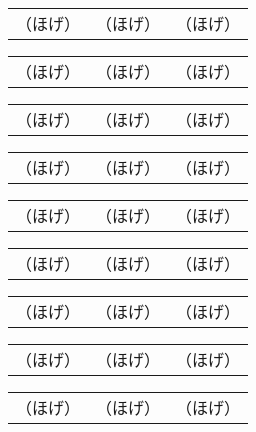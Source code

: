 \documentclass{jarticle}
\begin{document}
\begin{tabular}{|c|c|c|}
（ほげ）&（ほげ）&（ほげ）
\end{tabular}

\begin{tabular}{|l|l|l|}
（ほげ）&（ほげ）&（ほげ）
\end{tabular}

\begin{tabular}{|r|r|r|}
（ほげ）&（ほげ）&（ほげ）
\end{tabular}

\begin{tabular}{|c|c|c|}
（ほげ） & （ほげ） & （ほげ）
\end{tabular}

\begin{tabular}{|l|l|l|}
（ほげ） & （ほげ） & （ほげ）
\end{tabular}

\begin{tabular}{|r|r|r|}
（ほげ） & （ほげ） & （ほげ）
\end{tabular}


\begin{tabular}{|c|c|c|}
\mbox{（ほげ）}&\mbox{（ほげ）}&\mbox{（ほげ）}
\end{tabular}

\begin{tabular}{|l|l|l|}
\mbox{（ほげ）}&\mbox{（ほげ）}&\mbox{（ほげ）}
\end{tabular}

\begin{tabular}{|r|r|r|}
\mbox{（ほげ）}&\mbox{（ほげ）}&\mbox{（ほげ）}
\end{tabular}
\end{document}
